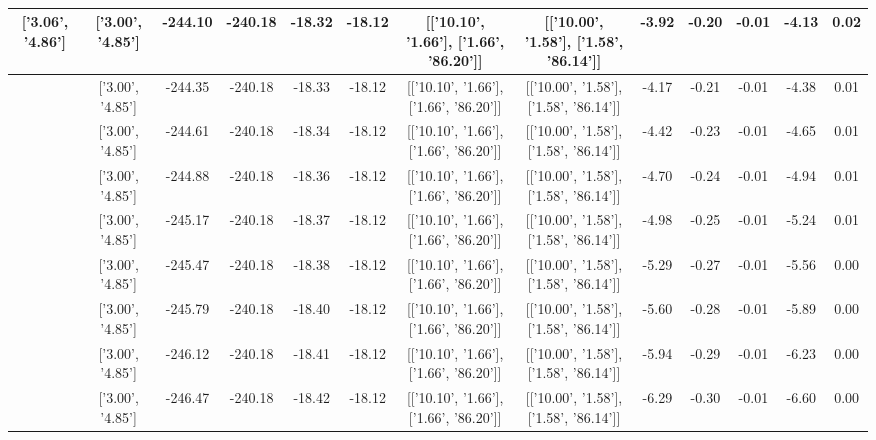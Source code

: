 \begin{table}[htbp]
\begin{adjustbox}{angle=90}
\begin{tabular}{|c|c|c|c|c|c|c|c|c|c|c|c|c|}
 ['3.06', '4.86'] & ['3.00', '4.85'] & -244.10 & -240.18 & -18.32 & -18.12 & [['10.10', '1.66'], ['1.66', '86.20']] & [['10.00', '1.58'], ['1.58', '86.14']] & -3.92 & -0.20 & -0.01 & -4.13 & 0.02\\ \hline
 ['3.06', '4.86'] & ['3.00', '4.85'] & -244.35 & -240.18 & -18.33 & -18.12 & [['10.10', '1.66'], ['1.66', '86.20']] & [['10.00', '1.58'], ['1.58', '86.14']] & -4.17 & -0.21 & -0.01 & -4.38 & 0.01\\ \hline
 ['3.07', '4.86'] & ['3.00', '4.85'] & -244.61 & -240.18 & -18.34 & -18.12 & [['10.10', '1.66'], ['1.66', '86.20']] & [['10.00', '1.58'], ['1.58', '86.14']] & -4.42 & -0.23 & -0.01 & -4.65 & 0.01\\ \hline
 ['3.07', '4.86'] & ['3.00', '4.85'] & -244.88 & -240.18 & -18.36 & -18.12 & [['10.10', '1.66'], ['1.66', '86.20']] & [['10.00', '1.58'], ['1.58', '86.14']] & -4.70 & -0.24 & -0.01 & -4.94 & 0.01\\ \hline
 ['3.07', '4.86'] & ['3.00', '4.85'] & -245.17 & -240.18 & -18.37 & -18.12 & [['10.10', '1.66'], ['1.66', '86.20']] & [['10.00', '1.58'], ['1.58', '86.14']] & -4.98 & -0.25 & -0.01 & -5.24 & 0.01\\ \hline
 ['3.08', '4.86'] & ['3.00', '4.85'] & -245.47 & -240.18 & -18.38 & -18.12 & [['10.10', '1.66'], ['1.66', '86.20']] & [['10.00', '1.58'], ['1.58', '86.14']] & -5.29 & -0.27 & -0.01 & -5.56 & 0.00\\ \hline
 ['3.08', '4.86'] & ['3.00', '4.85'] & -245.79 & -240.18 & -18.40 & -18.12 & [['10.10', '1.66'], ['1.66', '86.20']] & [['10.00', '1.58'], ['1.58', '86.14']] & -5.60 & -0.28 & -0.01 & -5.89 & 0.00\\ \hline
 ['3.09', '4.86'] & ['3.00', '4.85'] & -246.12 & -240.18 & -18.41 & -18.12 & [['10.10', '1.66'], ['1.66', '86.20']] & [['10.00', '1.58'], ['1.58', '86.14']] & -5.94 & -0.29 & -0.01 & -6.23 & 0.00\\ \hline
 ['3.09', '4.86'] & ['3.00', '4.85'] & -246.47 & -240.18 & -18.42 & -18.12 & [['10.10', '1.66'], ['1.66', '86.20']] & [['10.00', '1.58'], ['1.58', '86.14']] & -6.29 & -0.30 & -0.01 & -6.60 & 0.00\\ \hline
            \end{tabular}
        \end{adjustbox}
        \caption{}
        \label{}
    \end{table}
    